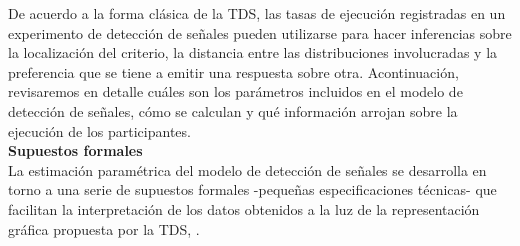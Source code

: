 De acuerdo a la forma clásica de la TDS, las tasas de ejecución registradas en un experimento de detección de señales pueden utilizarse para hacer inferencias sobre la localización del criterio, la distancia entre las distribuciones involucradas y la preferencia que se tiene a emitir una respuesta sobre otra. Acontinuación, revisaremos en detalle cuáles son los parámetros incluidos en el modelo de detección de señales, cómo se calculan y qué información arrojan sobre la ejecución de los participantes.\\

  \textbf{Supuestos formales}\\

La estimación paramétrica del modelo de detección de señales se desarrolla en torno a una serie de supuestos formales -pequeñas especificaciones técnicas- que facilitan la interpretación de los datos obtenidos a la luz de la representación gráfica propuesta por la TDS, \parencite{Wickens, Gescheider}.\\ 

